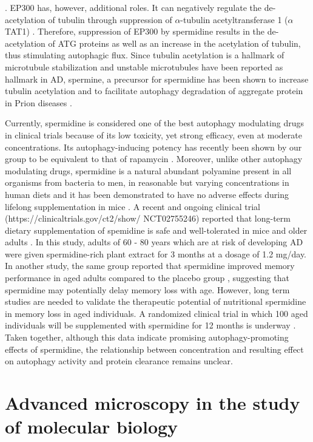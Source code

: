 \citep{Eisenberg2014,Lee2009,Sebti2014}. EP300 has, however, additional roles. It can negatively regulate the de-acetylation of tubulin through suppression of $\alpha$-tubulin acetyltransferase 1 ($\alpha$TAT1) \citep{Mackeh2014}. Therefore, suppression of  EP300 by spermidine results in the de-acetylation of ATG proteins as well as an  increase in the acetylation of tubulin, thus stimulating autophagic flux. Since tubulin acetylation is a hallmark of microtubule stabilization and unstable microtubules have been reported as hallmark in AD, spermine, a precursor for spermidine has been shown to increase tubulin acetylation and to facilitate autophagy  degradation of aggregate protein in Prion diseases \citep{Phadwal2018}.

Currently, spermidine is considered one of the best autophagy modulating drugs in clinical trials because of its low toxicity, yet strong efficacy, even at moderate concentrations. Its autophagy-inducing potency has recently been shown by our group to be equivalent to that of rapamycin \citep{DuToit2018b}. Moreover, unlike other autophagy modulating drugs, spermidine is a natural abundant polyamine present in all organisms from bacteria to men, in reasonable but varying concentrations in human diets and it has been demonstrated to have no adverse effects during lifelong supplementation in mice \citep{Eisenberg2016a}. A recent and ongoing clinical trial (https://clinicaltrials.gov/ct2/show/ NCT02755246) reported that long-term dietary supplementation of spemidine is safe and well-tolerated in mice and older adults \citep{Schwarz2018}. In this study, adults of 60 - 80 years which are at risk of developing AD were given spermidine-rich plant extract for 3 months at a dosage of 1.2 mg/day. In another study, the same group reported that spermidine improved memory performance in aged adults compared to the placebo group \citep{Wirth2018}, suggesting that spermidine may potentially delay memory loss with age. However, long term studies are needed to validate the therapeutic potential of nutritional spermidine in memory loss in aged individuals. A randomized clinical trial in which 100 aged individuals will be supplemented with spermidine for 12 months is underway \citep{Wirth2019}. Taken together, although this data indicate promising autophagy-promoting effects of spermidine, the relationship between concentration and resulting effect on autophagy activity and protein clearance remains unclear.

\section{Advanced microscopy in the study of molecular biology}
